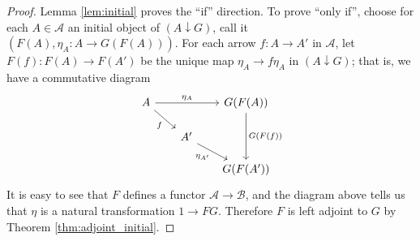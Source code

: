 \documentclass[10pt,oneside]{book}
\def\~#1{\mathscr{#1}}
\theoremstyle{plain}
\theoremstyle{definition}
\theoremstyle{remark}
\numberwithin{equation}{section}
\numberwithin{figure}{section}
\begin{document}
\begin{proof}
    Lemma \ref{lem:initial} proves the ``if'' direction. To prove ``only if'', choose for each $A \in \~A$ an initial object of $(A \downarrow G)$, call it $\left(F(A), \eta_A: A \to G(F(A))\right)$. For each arrow $f: A \to A'$ in $\~A$, let $F(f): F(A) \to F(A')$ be the unique map $\eta_A \to f\eta_A$ in $(A \downarrow G)$; that is, we have a commutative diagram
    \[\begin{tikzcd}[sep  = scriptsize]
        A && {G(F(A))} \\
        & {A'} \\
        && {G(F(A'))}
        \arrow["{\eta_A}", from=1-1, to=1-3]
        \arrow["f"', from=1-1, to=2-2]
        \arrow["{G(F(f))}", from=1-3, to=3-3]
        \arrow["{\eta_{A'}}"', from=2-2, to=3-3]
    \end{tikzcd}\]
    It is easy to see that $F$ defines a functor $\~A \to \~B$, and the diagram above tells us that $\eta$ is a natural transformation $1 \to FG$. Therefore $F$ is left adjoint to $G$ by Theorem \ref{thm:adjoint_initial}.
\end{proof}
\end{document}
